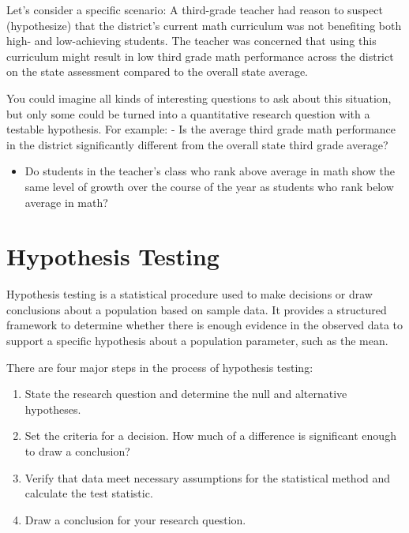 \documentclass[
  letterpaper,
  DIV=11,
  numbers=noendperiod]{scrreprt}
\providecommand{\tightlist}{%
  \setlength{\itemsep}{0pt}\setlength{\parskip}{0pt}}
\begin{document}
Let's consider a specific scenario: A third-grade teacher had reason to
suspect (hypothesize) that the district's current math curriculum was
not benefiting both high- and low-achieving students. The teacher was
concerned that using this curriculum might result in low third grade
math performance across the district on the state assessment compared to
the overall state average.

You could imagine all kinds of interesting questions to ask about this
situation, but only some could be turned into a quantitative research
question with a testable hypothesis. For example: - Is the average third
grade math performance in the district significantly different from the
overall state third grade average?

\begin{itemize}
\tightlist
\item
  Do students in the teacher's class who rank above average in math show
  the same level of growth over the course of the year as students who
  rank below average in math?
\end{itemize}

\section{Hypothesis Testing}\label{hypothesis-testing}

Hypothesis testing is a statistical procedure used to make decisions or
draw conclusions about a population based on sample data. It provides a
structured framework to determine whether there is enough evidence in
the observed data to support a specific hypothesis about a population
parameter, such as the mean.

There are four major steps in the process of hypothesis testing:

\begin{enumerate}
\def\labelenumi{\arabic{enumi}.}
\item
  State the research question and determine the null and alternative
  hypotheses.
\item
  Set the criteria for a decision. How much of a difference is
  significant enough to draw a conclusion?
\item
  Verify that data meet necessary assumptions for the statistical method
  and calculate the test statistic.
\item
  Draw a conclusion for your research question.
\end{enumerate}
\end{document}
